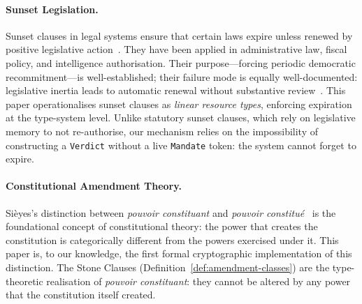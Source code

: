 \paragraph{Sunset Legislation.}
Sunset clauses in legal systems ensure that certain laws expire
unless renewed by positive legislative action~\cite{kerwin2018}.
They have been applied in administrative law, fiscal policy, and
intelligence authorisation. Their purpose---forcing periodic
democratic recommitment---is well-established; their failure mode
is equally well-documented: legislative inertia leads to automatic
renewal without substantive review~\cite{graetz2010}. This paper
operationalises sunset clauses as \emph{linear resource types},
enforcing expiration at the type-system level. Unlike statutory
sunset clauses, which rely on legislative memory to not re-authorise,
our mechanism relies on the impossibility of constructing a
\texttt{Verdict} without a live \texttt{Mandate} token: the system
cannot forget to expire.

\paragraph{Constitutional Amendment Theory.}
Si\`{e}yes's distinction between \emph{pouvoir constituant} and
\emph{pouvoir constitu\'{e}}~\cite{sieyes1789} is the foundational
concept of constitutional theory: the power that creates the
constitution is categorically different from the powers exercised
under it. This paper is, to our knowledge, the first formal
cryptographic implementation of this distinction. The Stone Clauses
(Definition~\ref{def:amendment-classes}) are the type-theoretic
realisation of \emph{pouvoir constituant}: they cannot be altered
by any power that the constitution itself created.

